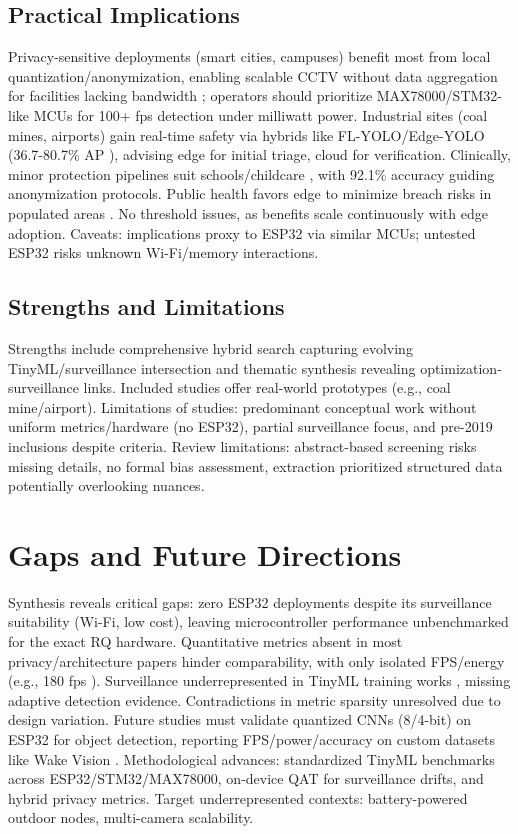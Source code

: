 \documentclass[12pt, a4paper]{article}
\begin{document}
\subsection{Practical Implications}
Privacy-sensitive deployments (smart cities, campuses) benefit most from local quantization/anonymization, enabling scalable CCTV without data aggregation for facilities lacking bandwidth \cite{myneni2022, yuan2020}; operators should prioritize MAX78000/STM32-like MCUs for 100+ fps detection under milliwatt power. Industrial sites (coal mines, airports) gain real-time safety via hybrids like FL-YOLO/Edge-YOLO (36.7-80.7\% AP \cite{xu2021, lyu2022}), advising edge for initial triage, cloud for verification. Clinically, minor protection pipelines suit schools/childcare \cite{yuan2020}, with 92.1\% accuracy guiding anonymization protocols. Public health favors edge to minimize breach risks in populated areas \cite{huang2023}. No threshold issues, as benefits scale continuously with edge adoption. Caveats: implications proxy to ESP32 via similar MCUs; untested ESP32 risks unknown Wi-Fi/memory interactions.

\subsection{Strengths and Limitations}
Strengths include comprehensive hybrid search capturing evolving TinyML/surveillance intersection and thematic synthesis revealing optimization-surveillance links. Included studies offer real-world prototypes (e.g., coal mine/airport). Limitations of studies: predominant conceptual work without uniform metrics/hardware (no ESP32), partial surveillance focus, and pre-2019 inclusions despite criteria. Review limitations: abstract-based screening risks missing details, no formal bias assessment, extraction prioritized structured data potentially overlooking nuances.

\section{Gaps and Future Directions}
Synthesis reveals critical gaps: zero ESP32 deployments despite its surveillance suitability (Wi-Fi, low cost), leaving microcontroller performance unbenchmarked for the exact RQ hardware. Quantitative metrics absent in most privacy/architecture papers hinder comparability, with only isolated FPS/energy (e.g., 180 fps \cite{moosmann2023}). Surveillance underrepresented in TinyML training works \cite{aatab2023, roveri2022}, missing adaptive detection evidence. Contradictions in metric sparsity unresolved due to design variation. Future studies must validate quantized CNNs (8/4-bit) on ESP32 for object detection, reporting FPS/power/accuracy on custom datasets like Wake Vision \cite{banbury2024}. Methodological advances: standardized TinyML benchmarks across ESP32/STM32/MAX78000, on-device QAT for surveillance drifts, and hybrid privacy metrics. Target underrepresented contexts: battery-powered outdoor nodes, multi-camera scalability.
\end{document}
